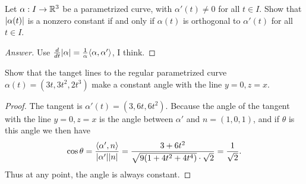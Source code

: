 \documentclass{article}
\begin{document}
\noindent\hrulefill
\begin{exercise}
  Let $\alpha:I\to\mathbb{R}^3$ be a parametrized curve, with $\alpha'(t)\neq 0$ for all $t\in I$.
  Show that $\lvert\alpha(t)\rvert$ is a nonzero constant if and only if $\alpha(t)$
  is orthogonal to $\alpha'(t)$ for all $t\in I$.
\end{exercise}
\noindent\hrulefill
\begin{proof}[Answer]
  Use $\frac d{dt}\lvert\alpha\rvert=\frac1{\alpha}\langle\alpha,\alpha'\rangle$, I think.
\end{proof}

\noindent\hrulefill
\begin{exercise}
  Show that the tanget lines to the regular parametrized curve
  $\alpha(t)=(3t,3t^2,2t^3)$ make a constant angle with the line $y=0, z=x$.
\end{exercise}
\noindent\hrulefill
\begin{proof}
  The tangent is $\alpha'(t)=(3,6t,6t^2)$. Because the angle of the tangent with the line
  $y=0,z=x$ is the angle between $\alpha'$ and $n=(1,0,1)$, and if $\theta$ is this
  angle we then have
  \begin{align*}
    \cos\theta
    = \frac{\langle\alpha', n\rangle}{\lvert\alpha'\rvert\lvert n\rvert}
    = \frac{3+6t^2}{\sqrt{9(1+4t^2+4t^4)}\cdot\sqrt{2}}
    = \frac1{\sqrt 2}.
  \end{align*}
  Thus at any point, the angle is always constant.
\end{proof}
\end{document}
